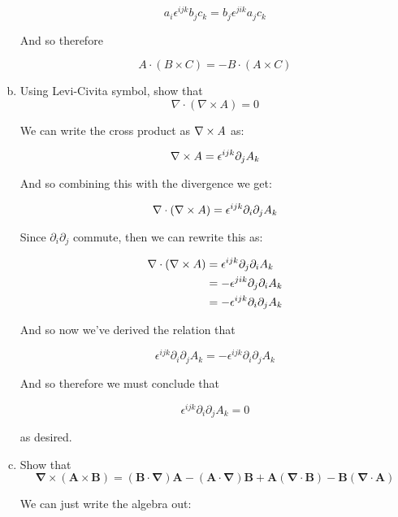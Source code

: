 \documentclass[10pt]{article}
\begin{document}
\begin{enumerate}[(a)]
\begin{solution}
            \[ a_i \epsilon^{ijk}b_jc_k = b_j \epsilon^{jik}a_jc_k\] 

            And so therefore

            \[ A \cdot (B \times C) = - B\cdot (A \times C)\] 
        \end{solution}
        \item Using Levi-Civita symbol, show that
        \[ \nabla \cdot (\nabla \times A) = 0\] 
        \begin{solution}
            We can write the cross product as $\nabla \times A$ as: 

            \[ \nabla \times A = \epsilon^{ijk}\partial_j A_k\] 

            And so combining this with the divergence we get: 

            \[ \nabla \cdot (\nabla \times A) = \epsilon^{ijk} \partial_i \partial_j A_k\]

            Since $\partial_i \partial_j$ commute, then we can rewrite this as: 

            \begin{align*}
                \nabla \cdot(\nabla \times A) &= \epsilon^{ijk} \partial_j \partial_i A_k\\
                &= -\epsilon^{jik} \partial_j \partial_i A_k\\
                &= -\epsilon^{ijk} \partial_i \partial_j A_k
            \end{align*}

            And so now we've derived the relation that 

            \[ \epsilon^{ijk} \partial_i \partial_j A_k = -\epsilon^{ijk}\partial_i \partial_j A_k\] 

            And so therefore we must conclude that 

            \[ \epsilon^{ijk} \partial_i \partial_j A_k = 0\] 

            as desired.
        \end{solution}
        \item Show that 
        \[ \mathbf{\nabla \times (A \times B) = (B \cdot \nabla)A - (A \cdot \nabla)B + A(\nabla \cdot B) - B(\nabla \cdot A)} \]

        \begin{solution}
            We can just write the algebra out: 


\end{solution}
\end{enumerate}
\end{document}
